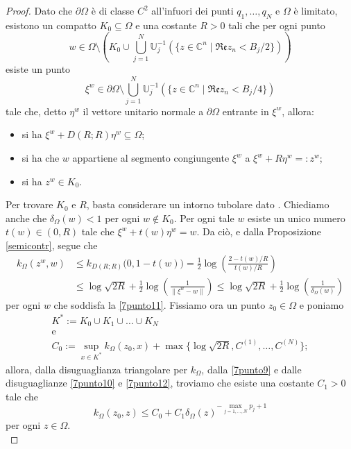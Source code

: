 \begin{proof}
    Dato che $\partial\Omega$ è di classe $C^2$ all'infuori dei punti $q_1,\dots,q_N$ e $\Omega$ è limitato, esistono un compatto $K_0\subseteq\Omega$ e una costante $R>0$ tali che per ogni punto
    \begin{equation}\label{7punto11}
        w\in\Omega\setminus\left(K_0\cup\bigcup_{j=1}^N\mathbb{U}_j^{-1}(\{z\in\mathbb{C}^n\mid\mathfrak{Re}z_n<B_j/2\})\right)
    \end{equation}
    esiste un punto
    $$\xi^w\in\partial\Omega\setminus\bigcup_{j=1}^N\mathbb{U}_j^{-1}(\{z\in\mathbb{C}^n\mid\mathfrak{Re}z_n<B_j/4\})$$
    tale che, detto $\eta^w$ il vettore unitario normale a $\partial\Omega$ entrante in $\xi^w$, allora:
    \begin{itemize}
        \item si ha $\xi^w+D(R;R)\eta^w\subseteq \Omega$;
        \item si ha che $w$ appartiene al segmento congiungente $\xi^w$ a $\xi^w+R\eta^w=:z^w$;
        \item si ha $z^w\in K_0$.
    \end{itemize}
    Per trovare $K_0$ e $R$, basta considerare un intorno tubolare dato \cite[Chapter 9, Theorem 20]{Sp}. Chiediamo anche che $\delta_\Omega(w)<1$ per ogni $w\not\in K_0$. Per ogni tale $w$ esiste un unico numero $t(w)\in(0,R)$ tale che $\xi^w+t(w)\eta^w=w$. Da ciò, e dalla Proposizione \ref{semicontr}, segue che
    \begin{equation}\label{7punto12}
        \begin{aligned}
            k_\Omega(z^w,w)&\le k_{D(R;R)}\big(0,1-t(w)\big)=\frac{1}{2}\log\left(\frac{2-t(w)/R}{t(w)/R}\right)\\
            &\le\log{\sqrt{2R}}+\frac{1}{2}\log\left(\frac{1}{\|\xi^w-w\|}\right)\le\log{\sqrt{2R}}+\frac{1}{2}\log\left(\frac{1}{\delta_\Omega(w)}\right)
        \end{aligned}
    \end{equation}
    per ogni $w$ che soddisfa la \eqref{7punto11}. Fissiamo ora un punto $z_0\in\Omega$ e poniamo
    \begin{gather*}
        K^*:=K_0\cup K_1\cup\dots\cup K_N\\
        \text{e}\\
        C_0:=\displaystyle\sup_{x\in K^*}k_\Omega(z_0,x)+\max\{\log{\sqrt{2R}},C^{(1)},\dots,C^{(N)}\};
    \end{gather*}
    allora, dalla disuguaglianza triangolare per $k_\Omega$, dalla \eqref{7punto9} e dalle disuguaglianze \eqref{7punto10} e \eqref{7punto12}, troviamo che esiste una costante $C_1>0$ tale che
    $$k_\Omega(z_0,z)\le C_0+C_1\delta_\Omega(z)^{-\max_{j=1,\dots,N}p_j+1}$$
    per ogni $z\in\Omega$.\\


\end{proof}
